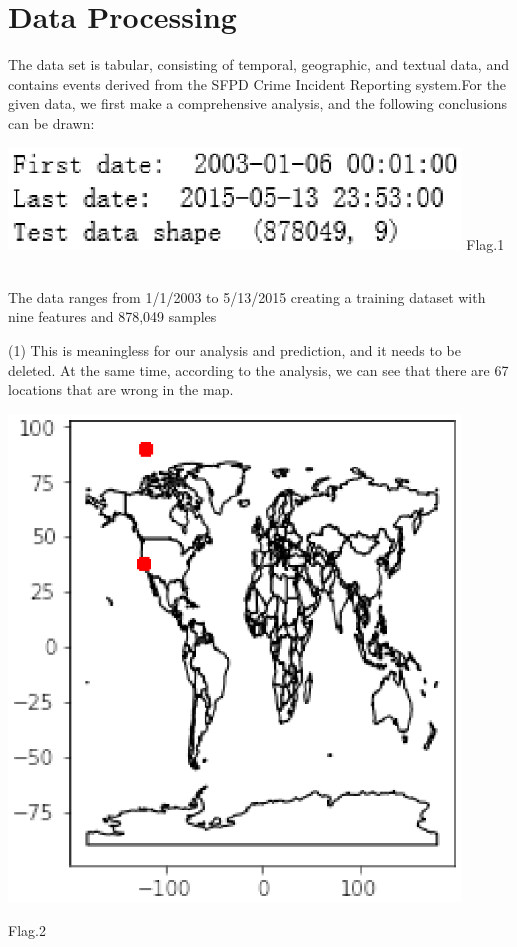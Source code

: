 \section{Data Processing} \label{sec-preliminaries}

The data set is tabular, consisting of temporal, geographic, and textual
data, and contains events derived from the SFPD Crime Incident Reporting 
system.For the given data, we first make a comprehensive analysis, and the 
following conclusions can be drawn:\\
\begin{center}
  \begin{minipage}{0.3\linewidth}
  \centering
  \includegraphics[width=0.9\textwidth]{kaggle/1.eps}
  {\small{Flag.1}}
  \end{minipage}
  \hfill
  \\
  The data ranges from 1/1/2003 to 5/13/2015 creating a training 
  dataset with nine features and 878,049 samples\\
\end{center}
(1) This is meaningless for our analysis and prediction, and it
 needs to be deleted. At the same time, according to the analysis, 
 we can see that there are 67 locations that are wrong in the map. \\
\begin{center}
  \begin{minipage}{0.4\linewidth}
  \centering

  \includegraphics[width=0.9\textwidth]{kaggle/5.eps}
 
  {\small{Flag.2}}

  \end{minipage}
  \hfill
\end{center}
